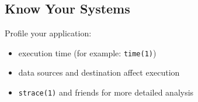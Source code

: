 \documentclass[xga]{xdvislides}
\begin{document}

\subsection{Know Your Systems}
Profile your application:
\begin{itemize}
	\item execution time (for example: {\tt time(1)})
	\item data sources and destination affect execution
	\item {\tt strace(1)} and friends for more detailed analysis
\end{itemize}
\end{document}
